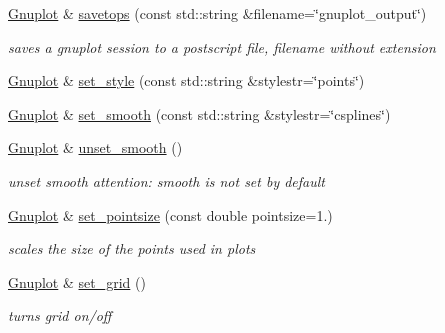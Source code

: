 \begin{DoxyCompactItemize}
\mbox{\label{class_gnuplot_a032072c7c01b508a7535a17fb08562b1}} 
\hyperlink{class_gnuplot}{Gnuplot} \& \hyperlink{class_gnuplot_a032072c7c01b508a7535a17fb08562b1}{savetops} (const std\+::string \&filename=\char`\"{}gnuplot\+\_\+output\char`\"{})
\begin{DoxyCompactList}\small\item\em saves a gnuplot session to a postscript file, filename without extension \end{DoxyCompactList}\item 
\hyperlink{class_gnuplot}{Gnuplot} \& \hyperlink{class_gnuplot_acfdcda292650775ebed4683e8e1515b5}{set\+\_\+style} (const std\+::string \&stylestr=\char`\"{}points\char`\"{})
\item 
\hyperlink{class_gnuplot}{Gnuplot} \& \hyperlink{class_gnuplot_aa18386919da2ec4c994f1f9c7195d384}{set\+\_\+smooth} (const std\+::string \&stylestr=\char`\"{}csplines\char`\"{})
\item 
\hyperlink{class_gnuplot}{Gnuplot} \& \hyperlink{class_gnuplot_ad9dfbccd66dece1dbe5803605c6ab08c}{unset\+\_\+smooth} ()
\begin{DoxyCompactList}\small\item\em unset smooth attention\+: smooth is not set by default \end{DoxyCompactList}\item 
\mbox{\label{class_gnuplot_a95ec1636a871447dfe99463b769339c7}} 
\hyperlink{class_gnuplot}{Gnuplot} \& \hyperlink{class_gnuplot_a95ec1636a871447dfe99463b769339c7}{set\+\_\+pointsize} (const double pointsize=1.)
\begin{DoxyCompactList}\small\item\em scales the size of the points used in plots \end{DoxyCompactList}\item 
\mbox{\label{class_gnuplot_a5416c8e81f1b9945b9631fa85a8d4f47}} 
\hyperlink{class_gnuplot}{Gnuplot} \& \hyperlink{class_gnuplot_a5416c8e81f1b9945b9631fa85a8d4f47}{set\+\_\+grid} ()
\begin{DoxyCompactList}\small\item\em turns grid on/off \end{DoxyCompactList}\item 
\mbox{\label{class_gnuplot_a53183e1487bc6977f0d46bf75d19b4d3}} 

\end{DoxyCompactItemize}
